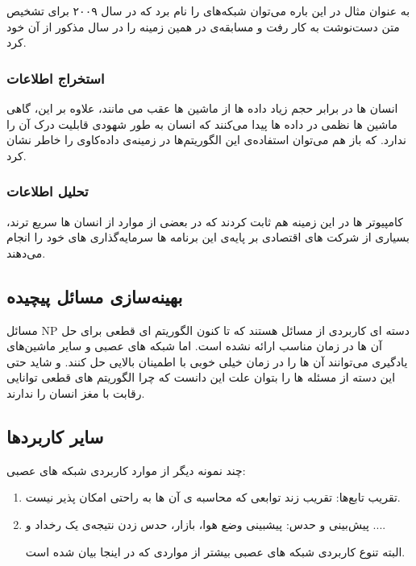 \documentclass[11pt,a4paper,twocolumn]{article}
\begin{document}
به عنوان مثال در این باره می‌توان شبکه‌های  را نام برد که در سال ۲۰۰۹ برای تشخیص متن دست‌نوشت به کار رفت و مسابقه‌ی  در همین زمینه را در سال مذکور از آن خود کرد.
\subsubsection{استخراج اطلاعات}
انسان ها در برابر حجم زیاد داده ها از ماشین ها عقب می مانند، علاوه بر این، گاهی ماشین ها نظمی در داده ها پیدا می‌کنند که انسان به طور شهودی قابلیت درک آن را ندارد. که باز هم می‌توان استفاده‌ی این الگوریتم‌ها در زمینه‌ی داده‌کاوی را خاطر نشان کرد.
\subsubsection{تحلیل اطلاعات}
 کامپیوتر ها در این زمینه هم ثابت کردند که در بعضی از موارد از انسان ها سریع ترند، بسیاری از شرکت های اقتصادی بر پایه‌ی این برنامه ها سرمایه‌گذاری های خود را انجام می‌دهند.
\subsection{بهینه‌سازی مسائل پیچیده}
مسائل NP دسته ای کاربردی از مسائل هستند که تا کنون الگوریتم ای قطعی برای حل آن ها در زمان مناسب ارائه نشده است. اما شبکه های عصبی و سایر ماشین‌های یادگیری می‌توانند آن ها را در زمان خیلی خوبی با اطمینان بالایی حل کنند. و شاید حتی این دسته از مسئله ها را بتوان علت این دانست که چرا الگوریتم های قطعی توانایی رقابت با مغز انسان را ندارند.
\subsection{سایر کاربردها}
چند نمونه دیگر از  موارد کاربردی شبکه های عصبی:
\begin{enumerate}
\item
تقریب تابع‌ها:
تقریب زند توابعی که محاسبه ی آن ها به راحتی امکان پذیر نیست.
\item
پیش‌بینی و حدس:
پیشبینی وضع هوا، بازار، حدس زدن نتیجه‌ی یک رخداد و ....

البته تنوع کاربردی شبکه های عصبی بیشتر از مواردی که در اینجا بیان شده است.

\end{enumerate}
\end{document}
